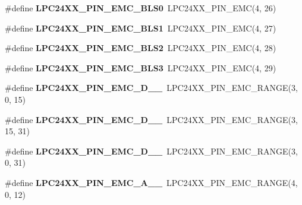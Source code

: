 \begin{DoxyCompactItemize}
\#define {\bfseries L\+P\+C24\+X\+X\+\_\+\+P\+I\+N\+\_\+\+E\+M\+C\+\_\+\+B\+L\+S0}~L\+P\+C24\+X\+X\+\_\+\+P\+I\+N\+\_\+\+E\+MC(4, 26)
\item 
\mbox{\label{group__lpc24xx__io_ga0de7a22902e5590e698f3a9cedc6388d}} 
\#define {\bfseries L\+P\+C24\+X\+X\+\_\+\+P\+I\+N\+\_\+\+E\+M\+C\+\_\+\+B\+L\+S1}~L\+P\+C24\+X\+X\+\_\+\+P\+I\+N\+\_\+\+E\+MC(4, 27)
\item 
\mbox{\label{group__lpc24xx__io_ga02057c9e4dd3f004d0f64560dfb910de}} 
\#define {\bfseries L\+P\+C24\+X\+X\+\_\+\+P\+I\+N\+\_\+\+E\+M\+C\+\_\+\+B\+L\+S2}~L\+P\+C24\+X\+X\+\_\+\+P\+I\+N\+\_\+\+E\+MC(4, 28)
\item 
\mbox{\label{group__lpc24xx__io_ga4c3e5ddcfae2bb3136af31d60f1efb5b}} 
\#define {\bfseries L\+P\+C24\+X\+X\+\_\+\+P\+I\+N\+\_\+\+E\+M\+C\+\_\+\+B\+L\+S3}~L\+P\+C24\+X\+X\+\_\+\+P\+I\+N\+\_\+\+E\+MC(4, 29)
\item 
\mbox{\label{group__lpc24xx__io_ga47f1fdb07f8370dc235618286e59de55}} 
\#define {\bfseries L\+P\+C24\+X\+X\+\_\+\+P\+I\+N\+\_\+\+E\+M\+C\+\_\+\+D\+\_\+\_}~L\+P\+C24\+X\+X\+\_\+\+P\+I\+N\+\_\+\+E\+M\+C\+\_\+\+R\+A\+N\+GE(3, 0, 15)
\item 
\mbox{\label{group__lpc24xx__io_ga50c46154652dc20c0692349f0e87a443}} 
\#define {\bfseries L\+P\+C24\+X\+X\+\_\+\+P\+I\+N\+\_\+\+E\+M\+C\+\_\+\+D\+\_\+\_}~L\+P\+C24\+X\+X\+\_\+\+P\+I\+N\+\_\+\+E\+M\+C\+\_\+\+R\+A\+N\+GE(3, 15, 31)
\item 
\mbox{\label{group__lpc24xx__io_ga1dadeaeda8f1bd3d13f62965fd613376}} 
\#define {\bfseries L\+P\+C24\+X\+X\+\_\+\+P\+I\+N\+\_\+\+E\+M\+C\+\_\+\+D\+\_\+\_}~L\+P\+C24\+X\+X\+\_\+\+P\+I\+N\+\_\+\+E\+M\+C\+\_\+\+R\+A\+N\+GE(3, 0, 31)
\item 
\mbox{\label{group__lpc24xx__io_ga20da28034e0d9d50ce220b8f2277e2a0}} 
\#define {\bfseries L\+P\+C24\+X\+X\+\_\+\+P\+I\+N\+\_\+\+E\+M\+C\+\_\+\+A\+\_\+\_}~L\+P\+C24\+X\+X\+\_\+\+P\+I\+N\+\_\+\+E\+M\+C\+\_\+\+R\+A\+N\+GE(4, 0, 12)
\item 
\mbox{\label{group__lpc24xx__io_ga439d2c9c46c62e27b309fefdde530648}} 

\end{DoxyCompactItemize}

